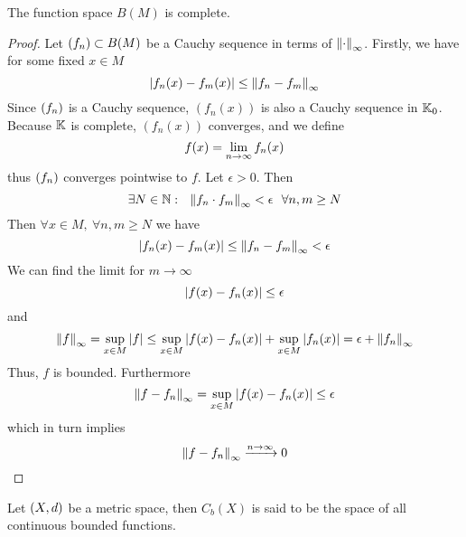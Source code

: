 \documentclass[../../script.tex]{subfiles}
\begin{document}
\begin{thm}
    The function space $B(M)$ is complete.
\end{thm}
\begin{proof}
    Let $\anyseqdef[f]{B(M)}$ be a Cauchy sequence in terms of $\supnorm{\cdot}$. Firstly, we have for some fixed $x \in M$
    \begin{equation}
        \abs{f_n(x) - f_m(x)} \le \supnorm{f_n - f_m}
    \end{equation}
    Since $\seq{f}$ is a Cauchy sequence, $(f_n(x))$ is also a Cauchy sequence in $\field_0$. Because $\field$ is complete,
    $(f_n(x))$ converges, and we define 
    \begin{equation}
        f(x) = \limn f_n(x)
    \end{equation}
    thus $\seq{f}$ converges pointwise to $f$. Let $\epsilon > 0$. Then 
    \begin{equation}
        \exists N \in \natn: ~~\supnorm{f_n \cdot f_m} < \epsilon ~~\forall n, m \ge N
    \end{equation}
    Then $\forall x \in M, ~\forall n, m \ge N$ we have 
    \begin{equation}
        \abs{f_n(x) - f_m(x)} \le \supnorm{f_n - f_m} < \epsilon
    \end{equation}
    We can find the limit for $m \rightarrow \infty$
    \begin{equation}
        \abs{f(x) - f_n(x)} \le \epsilon
    \end{equation}
    and 
    \begin{equation}
        \supnorm{f} = \sup_{x \in M}\abs{f} \le \sup_{x \in M} \abs{f(x) - f_n(x)} + \sup_{x \in M} \abs{f_n(x)} = \epsilon + \supnorm{f_n}
    \end{equation}
    Thus, $f$ is bounded. Furthermore
    \begin{equation}
        \supnorm{f - f_n} = \sup_{x \in M} \abs{f(x) - f_n(x)} \le \epsilon
    \end{equation}
    which in turn implies 
    \begin{equation}
        \supnorm{f - f_n} \conv{n \rightarrow \infty} 0
    \end{equation}
\end{proof}

\begin{defi}
    Let $\metric$ be a metric space, then $C_b(X)$ is said to be the space of all continuous bounded functions.
\end{defi}
\end{document}
